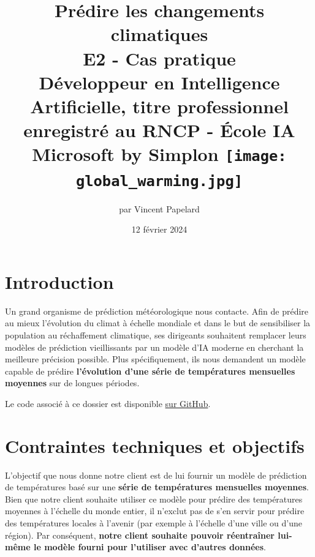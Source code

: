 \documentclass[french]{article}
\title{%
    \huge Prédire les changements climatiques  \\
    \bigskip
    \large E2 - Cas pratique \\ 
    Développeur en Intelligence Artificielle,
    titre professionnel enregistré au RNCP - École IA Microsoft by Simplon
    \vfill
    \texttt{[image: global\_warming.jpg]}
    \vfill}
\date{12 février 2024}
\author{par Vincent Papelard}
\begin{document}
    \renewcommand{\contentsname}{Table des Matières}
    \renewcommand{\refname}{Références}
    \maketitle
    \newpage
    \tableofcontents
    \newpage

    \section*{Introduction}

    Un grand organisme de prédiction météorologique nous contacte. 
    Afin de prédire au mieux l'évolution du climat à échelle mondiale et dans le but de sensibiliser la population au réchaffement climatique, ses dirigeants souhaitent remplacer leurs modèles de prédiction vieillissants par un modèle d'IA moderne en cherchant la meilleure précision possible. Plus spécifiquement, ils nous demandent un modèle capable de prédire \textbf{l'évolution d'une série de températures mensuelles moyennes} sur de longues périodes. 
    
    Le code associé à ce dossier est disponible \href{https://github.com/vinpap/predict_climate_change}{sur GitHub}.


    \section{Contraintes techniques et objectifs}

    L'objectif que nous donne notre client est de lui fournir un modèle de prédiction de températures basé sur une \textbf{série de températures mensuelles moyennes}. Bien que notre client souhaite utiliser ce modèle pour prédire des températures moyennes à l'échelle du monde entier, il n'exclut pas de s'en servir pour prédire des températures locales à l'avenir (par exemple à l'échelle d'une ville ou d'une région). Par conséquent, \textbf{notre client souhaite pouvoir réentraîner lui-même le modèle fourni pour l'utiliser avec d'autres données}.
\end{document}
